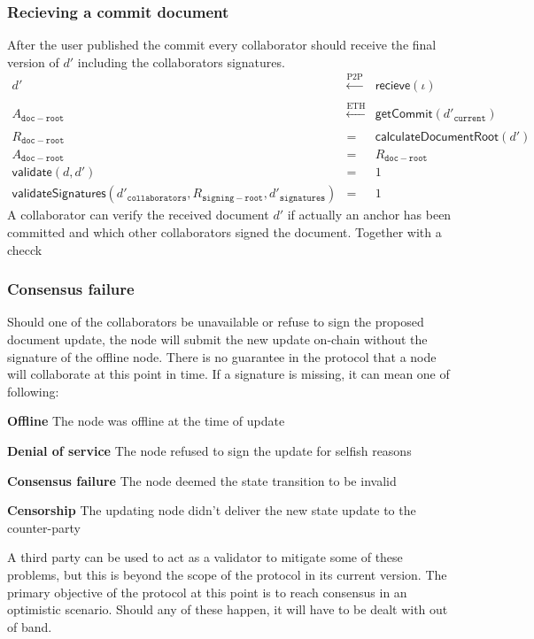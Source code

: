 \subsubsection{Recieving a commit document}
After the user published the commit every collaborator should receive the final version of $d'$ including the collaborators signatures.
\begin{eqnarray}
    d' & \xleftarrow[]{\text{P2P}} & \mathsf{recieve}(\iota) \\
        A_{\mathtt{doc-root}} & \xleftarrow[]{\text{ETH}} & \mathsf{getCommit}(d'_{\mathtt{current}}) \\
    R_{\mathtt{doc-root}} & = & \mathsf{calculateDocumentRoot}(d')  \\
    A_{\mathtt{doc-root}} &= &R_{\mathtt{doc-root}} \\
   \mathsf{validate}(d, d') & = & 1\\
     \mathsf{validateSignatures}(d'_{\mathtt{collaborators}},R_{\mathtt{signing-root}},d'_{\mathtt{signatures}}) & = & 1
\end{eqnarray}
A collaborator can verify the received document $d'$ if actually an anchor has been committed and which other collaborators signed the document. Together with a checck

\subsubsection{Consensus failure}
Should one of the collaborators be unavailable or refuse to sign the proposed document update, the node will submit the new update on-chain without the signature of the offline node. There is no guarantee in the protocol that a node will collaborate at this point in time. If a signature is missing, it can mean one of following:
\begin{description}
    \item{\textbf{Offline}} The node was offline at the time of update
    \item{\textbf{Denial of service}} The node refused to sign the update for selfish reasons
    \item{\textbf{Consensus failure}} The node deemed the state transition to be invalid
    \item{\textbf{Censorship}} The updating node didn't deliver the new state update to the counter-party
\end{description}
A third party can be used to act as a validator to mitigate some of these problems, but this is beyond the scope of the protocol in its current version. The primary objective of the protocol at this point is to reach consensus in an optimistic scenario. Should any of these happen, it will have to be dealt with out of band.

